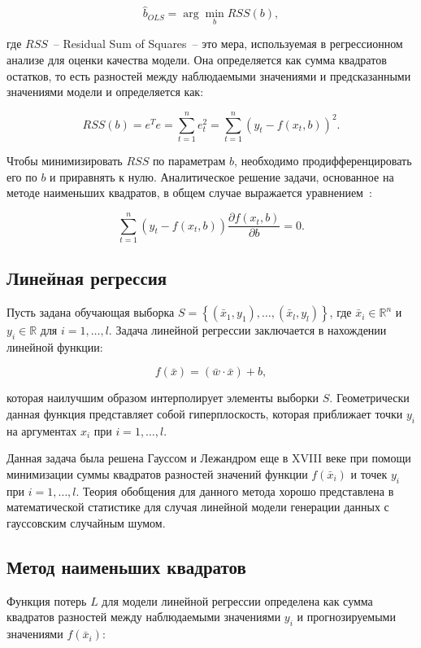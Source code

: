 \documentclass[11pt,a4paper]{article}
\begin{document}
\begin{equation}
\hat b_{OLS}=\arg \min_{b}RSS(b),
\end{equation}

где $RSS$~-- Residual Sum of Squares~-- это мера, используемая в регрессионном анализе для оценки качества модели. Она определяется как сумма квадратов остатков, то есть разностей между наблюдаемыми значениями и предсказанными значениями модели и определяется как:

\begin{equation} \label{eq:4}
RSS(b)=e^Te=\sum_{t=1}^n e^2_t=\sum_{t=1}^n (y_t-f(x_t,b))^2.
\end{equation}

Чтобы минимизировать $RSS$ по параметрам $b$, необходимо продифференцировать его по $b$ и приравнять к нулю. Аналитическое решение задачи, основанное на методе наименьших квадратов, в общем случае выражается уравнением~\cite{magnus}:

\begin{equation} \label{eq:5}
\sum_{t=1}^n(y_t-f(x_t,b))\frac {\partial f(x_t,b)}{\partial b}=0 .
\end{equation}

\subsection{Линейная регрессия}
Пусть задана обучающая выборка $S = \left\{ (\bar{x}_1, y_1), \ldots, (\bar{x}_l, y_l) \right\}$, где $\bar{x}_i \in \mathbb{R}^n$ и $y_i \in \mathbb{R}$ для $i = 1, \ldots, l$. Задача линейной регрессии заключается в нахождении линейной функции:

\begin{equation}
f(\bar{x}) = (\bar{w} \cdot \bar{x}) + b,
\end{equation}

которая наилучшим образом интерполирует элементы выборки $S$. Геометрически данная функция представляет собой гиперплоскость, которая приближает точки $y_i$ на аргументах $x_i$ при $i = 1, \ldots, l$.

Данная задача была решена Гауссом и Лежандром еще в XVIII веке при помощи минимизации суммы квадратов разностей значений функции $f(\bar{x}_i)$ и точек $y_i$ при $i = 1, \ldots, l$. Теория обобщения для данного метода хорошо представлена в математической статистике для случая линейной модели генерации данных с гауссовским случайным шумом.

\subsection{Метод наименьших квадратов}
Функция потерь $L$ для модели линейной регрессии определена как сумма квадратов разностей между наблюдаемыми значениями $y_i$ и прогнозируемыми значениями $f(\bar{x}_i)$:
\end{document}
